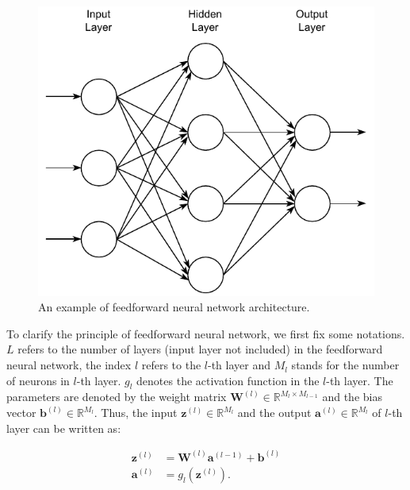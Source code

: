 \documentclass[
	parskip, 			   %
	twoside, 			   %
	DIV=14, 			   %
	BCOR=15.0mm, 		   %
	headsepline, 		   %
	open=right, 		   %
	captions=tableheading, %
	bibliography=totoc,    %
	numbers=noenddot       %
]{scrreprt}
\begin{document}
\clearpage
\begin{figure}[h!]
    \centering
    \includegraphics[scale=1]{figures/feedforward_neural_network.pdf}
    \caption{An example of feedforward neural network architecture.}
    \label{fig:feedforward}
\end{figure}

To clarify the principle of feedforward neural network, we first fix some notations. $L$ refers to the number of layers (input layer not included) in the feedforward neural network, the index $l$ refers to the $l$-th layer and $M_{l}$ stands for the number of neurons in $l$-th layer. $g_{l}$ denotes the activation function in the $l$-th layer. The parameters are denoted by the weight matrix $\mathbf{W}^{(l)} \in \mathbb{R}^{M_{l} \times M_{l-1}}$ and the bias vector $\mathbf{b}^{(l)} \in \mathbb{R}^{M_{l}}$. Thus, the input $\mathbf{z}^{(l)} \in \mathbb{R}^{M_{l}}$ and the output $\mathbf{a}^{(l)} \in \mathbb{R}^{M_{l}}$ of $l$-th layer can be written as:

\begin{equation}
    \label{eq:input_output_neuron}
    \begin{aligned}
    \mathbf{z}^{(l)} &= \mathbf{W}^{(l)} \mathbf{a}^{(l-1)} + \mathbf{b}^{(l)}\\
    \mathbf{a}^{(l)} &= g_{l}(\mathbf{z}^{(l)}).
    \end{aligned}
\end{equation}
\end{document}
